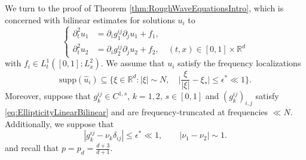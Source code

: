 \documentclass{amsart}
\theoremstyle{definition}
\newcommand{\R}{\mathbb{R}}
\begin{document}
We turn to the proof of Theorem \ref{thm:RoughWaveEquationsIntro}, which is concerned with bilinear estimates for solutions $u_i$ to
\begin{equation*}
\left\{ \begin{array}{cl}
\partial_t^2 u_{1} &= \partial_i g^{ij}_1 \partial_j u_{1} + f_1, \\
\partial_t^2 u_{2} &= \partial_i g^{ij}_2 \partial_j u_{2} + f_2, \quad (t,x) \in [0,1] \times \R^d
\end{array} \right.
\end{equation*}
with $f_i \in L_t^1([0,1];L_x^2)$. We assume that $u_{i}$ satisfy the frequency localizations
\begin{equation*}
\text{supp}(\hat{u}_{i}) \subseteq \{ \xi \in \R^d : |\xi| \sim N, \quad \big| \frac{\xi}{|\xi|} - \xi_{*} \big| \leq \epsilon^* \ll 1\}.
\end{equation*}
Moreover, suppose that $g^{ij}_k \in C^{1,s}$, $k=1,2$, $s \in [0,1]$ and $(g^{ij}_k)_{i,j}$ satisfy \eqref{eq:EllipticityLinearBilinear} and are frequency-truncated at frequencies $\ll N$. Additionally, we suppose that
\begin{equation*}
|g^{ij}_k - \nu_k \delta_{ij} | \leq \epsilon^* \ll 1, \qquad |\nu_1-\nu_2| \sim 1.
\end{equation*}
and recall that $p = p_d = \frac{d+3}{d+1}$.
\end{document}
